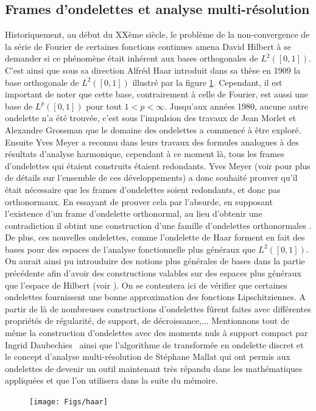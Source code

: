 	\subsection{Frames d'ondelettes et analyse multi-résolution}\label{sec:frameondelette}
Historiquement, au début du XXème siècle, le problème de la non-convergence de la série de Fourier de certaines fonctions continues amena David Hilbert à se demander si ce phénomène était inhérent aux bases orthogonales de $L^2([0,1])$.
C'est ainsi que sous sa direction Alfréd Haar introduit dans sa thèse \cite{haar} en 1909 la base orthogonale de $L^2([0,1])$ illustré par la figure \ref{fig:haar}.
Cependant, il est important de noter que cette base, contrairement à celle de Fourier, est aussi une base de $L^p([0,1])$ pour tout $1<p<\infty$.
Jusqu'aux années 1980, aucune autre ondelette n'a été trouvée, c'est sous l'impulsion des travaux de Jean Morlet et Alexandre Grossman que le domaine des ondelettes a commencé à être exploré.
Ensuite Yves Meyer a reconnu dans leurs travaux des formules analogues à des résultats d'analyse harmonique, cependant à ce moment là, tous les frames d'ondelettes qui étaient construits étaient redondants.
Yves Meyer (voir \cite{daubpers} pour plus de détails sur l'ensemble de ces développements) a donc souhaité prouver qu'il était nécessaire que les frames d'ondelettes soient redondants, et donc pas orthonormaux.
En essayant de prouver cela par l'absurde, en supposant l'existence d'un frame d'ondelette orthonormal, au lieu d'obtenir une contradiction il obtint une construction d'une famille d'ondelettes orthonormales \cite{meyer}.
De plus, ces nouvelles ondelettes, comme l'ondelette de Haar forment en fait des bases pour des espaces de l'analyse fonctionnelle plus généraux que $L^2([0,1])$.
On aurait ainsi pu introuduire des notions plus générales de bases dans la partie précédente afin d'avoir des constructions valables sur des espaces plus généraux que l'espace de Hilbert (voir \cite{jaffardondelettes}).
On se contentera ici de vérifier que certaines ondelettes fournissent une bonne approximation des fonctions Lipschitziennes.
\newline
A partir de là de nombreuses constructions d'ondelettes fûrent faites avec différentes propriétés de régularité, de support, de décroissance,... 
Mentionnons tout de même la construction d'ondelettes avec des moments nuls à support compact par Ingrid Daubechies \cite{daubbook} ainsi que l'algorithme de transformée en ondelette discret et le concept d'analyse multi-résolution de Stéphane Mallat \cite{mallatbook} qui ont permis aux ondelettes de devenir un outil maintenant très répandu dans les mathématiques appliquées et que l'on utilisera dans la suite du mémoire.
\begin{figure}
	\centering
	\texttt{[image: Figs/haar]}
	\label{fig:haar}	
\end{figure}	

